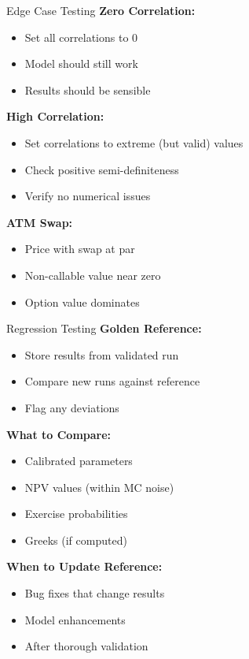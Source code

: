 \documentclass[aspectratio=169,11pt]{beamer}
\begin{document}
\begin{frame}{Edge Case Testing}
\textbf{Zero Correlation:}
\begin{itemize}
    \item Set all correlations to 0
    \item Model should still work
    \item Results should be sensible
\end{itemize}

\textbf{High Correlation:}
\begin{itemize}
    \item Set correlations to extreme (but valid) values
    \item Check positive semi-definiteness
    \item Verify no numerical issues
\end{itemize}

\textbf{ATM Swap:}
\begin{itemize}
    \item Price with swap at par
    \item Non-callable value near zero
    \item Option value dominates
\end{itemize}
\end{frame}

\begin{frame}{Regression Testing}
\textbf{Golden Reference:}
\begin{itemize}
    \item Store results from validated run
    \item Compare new runs against reference
    \item Flag any deviations
\end{itemize}

\textbf{What to Compare:}
\begin{itemize}
    \item Calibrated parameters
    \item NPV values (within MC noise)
    \item Exercise probabilities
    \item Greeks (if computed)
\end{itemize}

\textbf{When to Update Reference:}
\begin{itemize}
    \item Bug fixes that change results
    \item Model enhancements
    \item After thorough validation
\end{itemize}
\end{frame}
\end{document}
